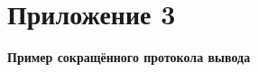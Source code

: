 


\chapter*{Приложение 3}
\vspace{5cm}

\begin{center}
\textbf{\LARGE{Пример сокращённого протокола вывода}}
\end{center}

